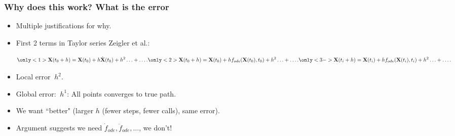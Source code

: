 \documentclass{beamer}
\begin{document}
\begin{frame}
\frametitle{Why does this work? What is the error}
\begin{itemize}
\item<1-> Multiple justifications for why.

\item<2-> First 2 terms in Taylor series {{\color{gray} Zeigler et al.}}:

\begin{equation*}
\only<1>{\mathbf{X}(t_{0}+h) = \mathbf{X}(t_{0})+h \dot{\mathbf{X}}(t_0)+h^2\ldots +\ldots.}
\only<2>{\mathbf{X}(t_{0}+h) = \mathbf{X}(t_{0})+h f_{ode}(\mathbf{X}(t_0),t_0)+h^2\ldots +\ldots.}
\only<3->{\mathbf{X}(t_{i}+h) = \mathbf{X}(t_{i})+h f_{ode}(\mathbf{X}(t_i),t_i)+h^2\ldots +\ldots.}
\end{equation*}

\item<4-> Local error  $~h^2$.

\item<5-> Global error: $~h^1$: All points converges to true path.

\item<6-> We want ``better" (larger $h$  (fewer steps, fewer calls), same error).

\item<7-> Argument suggests we need $\dot{f}_{ode},\ddot{f}_{ode},\ldots$, we don't!
\end{itemize}
\end{frame}
\end{document}
